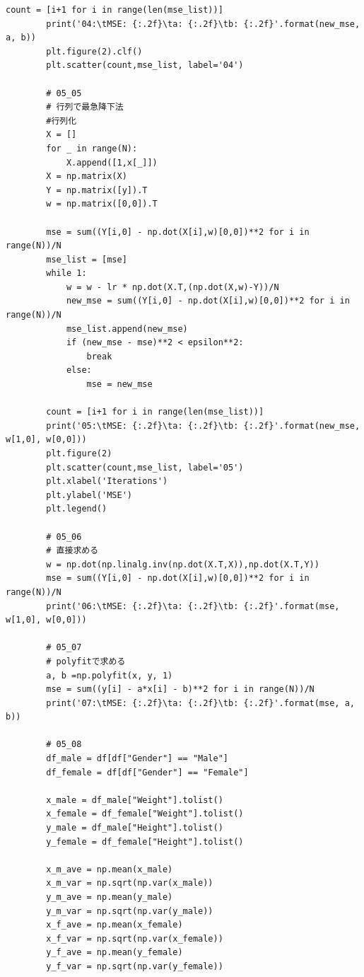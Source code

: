 \documentclass[a4paper]{ltjsarticle}
\begin{document}
\begin{lstlisting}[caption=code,label=code]
        count = [i+1 for i in range(len(mse_list))]
        print('04:\tMSE: {:.2f}\ta: {:.2f}\tb: {:.2f}'.format(new_mse, a, b))
        plt.figure(2).clf()
        plt.scatter(count,mse_list, label='04')
        
        # 05_05
        # 行列で最急降下法
        #行列化
        X = []
        for _ in range(N):
            X.append([1,x[_]])
        X = np.matrix(X)
        Y = np.matrix([y]).T
        w = np.matrix([0,0]).T
    
        mse = sum((Y[i,0] - np.dot(X[i],w)[0,0])**2 for i in range(N))/N
        mse_list = [mse]
        while 1:
            w = w - lr * np.dot(X.T,(np.dot(X,w)-Y))/N
            new_mse = sum((Y[i,0] - np.dot(X[i],w)[0,0])**2 for i in range(N))/N
            mse_list.append(new_mse)
            if (new_mse - mse)**2 < epsilon**2:
                break
            else:
                mse = new_mse
        
        count = [i+1 for i in range(len(mse_list))]
        print('05:\tMSE: {:.2f}\ta: {:.2f}\tb: {:.2f}'.format(new_mse, w[1,0], w[0,0]))
        plt.figure(2)
        plt.scatter(count,mse_list, label='05')
        plt.xlabel('Iterations')
        plt.ylabel('MSE')
        plt.legend()
        
        # 05_06
        # 直接求める
        w = np.dot(np.linalg.inv(np.dot(X.T,X)),np.dot(X.T,Y))
        mse = sum((Y[i,0] - np.dot(X[i],w)[0,0])**2 for i in range(N))/N
        print('06:\tMSE: {:.2f}\ta: {:.2f}\tb: {:.2f}'.format(mse, w[1,0], w[0,0]))
        
        # 05_07
        # polyfitで求める
        a, b =np.polyfit(x, y, 1)
        mse = sum((y[i] - a*x[i] - b)**2 for i in range(N))/N
        print('07:\tMSE: {:.2f}\ta: {:.2f}\tb: {:.2f}'.format(mse, a, b))
        
        # 05_08
        df_male = df[df["Gender"] == "Male"]
        df_female = df[df["Gender"] == "Female"]
    
        x_male = df_male["Weight"].tolist()
        x_female = df_female["Weight"].tolist()
        y_male = df_male["Height"].tolist()
        y_female = df_female["Height"].tolist()
    
        x_m_ave = np.mean(x_male)
        x_m_var = np.sqrt(np.var(x_male))
        y_m_ave = np.mean(y_male)
        y_m_var = np.sqrt(np.var(y_male))
        x_f_ave = np.mean(x_female)
        x_f_var = np.sqrt(np.var(x_female))
        y_f_ave = np.mean(y_female)
        y_f_var = np.sqrt(np.var(y_female))
    

\end{lstlisting}
\end{document}
